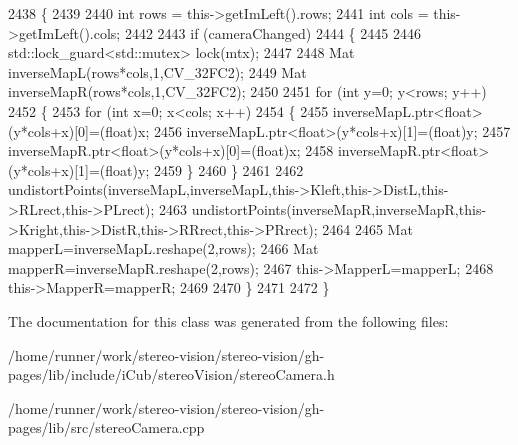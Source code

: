 \begin{DoxyCode}
2438 \{
2439 
2440     \textcolor{keywordtype}{int} rows = this->getImLeft().rows;
2441     \textcolor{keywordtype}{int} cols = this->getImLeft().cols;
2442 
2443     \textcolor{keywordflow}{if} (cameraChanged)
2444     \{
2445 
2446         std::lock\_guard<std::mutex> lock(mtx);
2447 
2448         Mat inverseMapL(rows*cols,1,CV\_32FC2);
2449         Mat inverseMapR(rows*cols,1,CV\_32FC2);
2450 
2451         \textcolor{keywordflow}{for} (\textcolor{keywordtype}{int} y=0; y<rows; y++)
2452         \{
2453             \textcolor{keywordflow}{for} (\textcolor{keywordtype}{int} x=0; x<cols; x++)
2454             \{
2455                 inverseMapL.ptr<\textcolor{keywordtype}{float}>(y*cols+x)[0]=(\textcolor{keywordtype}{float})x;
2456                 inverseMapL.ptr<\textcolor{keywordtype}{float}>(y*cols+x)[1]=(\textcolor{keywordtype}{float})y;
2457                 inverseMapR.ptr<\textcolor{keywordtype}{float}>(y*cols+x)[0]=(\textcolor{keywordtype}{float})x;
2458                 inverseMapR.ptr<\textcolor{keywordtype}{float}>(y*cols+x)[1]=(\textcolor{keywordtype}{float})y;
2459             \}
2460         \}
2461 
2462         undistortPoints(inverseMapL,inverseMapL,this->Kleft,this->DistL,this->RLrect,this->PLrect);
2463         undistortPoints(inverseMapR,inverseMapR,this->Kright,this->DistR,this->RRrect,this->PRrect);
2464 
2465         Mat mapperL=inverseMapL.reshape(2,rows);
2466         Mat mapperR=inverseMapR.reshape(2,rows);
2467         this->MapperL=mapperL;
2468         this->MapperR=mapperR;
2469 
2470     \}
2471 
2472 \}
\end{DoxyCode}


The documentation for this class was generated from the following files\+:\begin{DoxyCompactItemize}
\item 
/home/runner/work/stereo-\/vision/stereo-\/vision/gh-\/pages/lib/include/i\+Cub/stereo\+Vision/stereo\+Camera.\+h\item 
/home/runner/work/stereo-\/vision/stereo-\/vision/gh-\/pages/lib/src/stereo\+Camera.\+cpp\end{DoxyCompactItemize}
